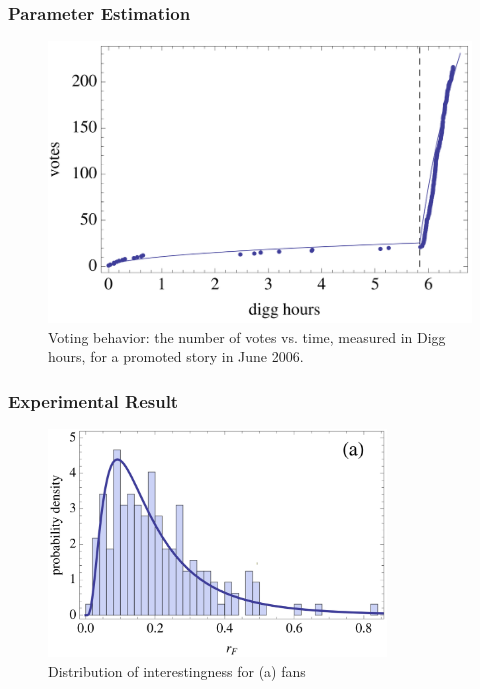 \documentclass[aspectratio=43]{beamer}
\begin{document}
\begin{frame}
\centering
\frametitle{Parameter Estimation}
\begin{minipage}{\textwidth}
\begin{figure}
\centering
\includegraphics[height=0.7\textheight]{fig07.PNG}
\caption{Voting behavior: the number of votes vs. time, measured in Digg hours, for a promoted story in June 2006.}
\end{figure}
\end{minipage}
\end{frame}

\begin{frame}
\frametitle{Experimental Result}
\centering
\begin{minipage}{\textwidth}
\begin{figure}
\centering
\includegraphics[width=0.8\textwidth]{fig08.PNG}
\caption{Distribution of interestingness for (a) fans}
\end{figure}
\end{minipage}
\end{frame}
\end{document}
